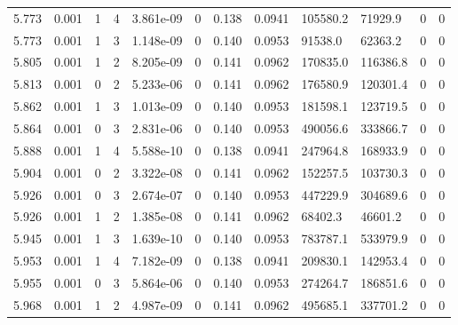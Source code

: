 \documentclass[preview]{standalone}
\begin{document}
{{{{{{{{\begin{tabular}{L{1.2cm}C{1.2cm} C{0.3cm}C{0.5cm} C{1.4cm}C{1.4cm} C{1.4cm}C{1.4cm} C{1.6cm}C{1.6cm} C{1.6cm}C{1.6cm}}
  5.773  &  0.001  & 1     &  4 &  3.861e-09  & 0  &  0.138&   0.0941& 105580.2 & 71929.9   &  0 & 0  \\ 
  5.773  &  0.001  & 1     &  3 &  1.148e-09  & 0  &  0.140&   0.0953& 91538.0 & 62363.2   &  0 & 0  \\ 
  5.805  &  0.001  & 1     &  2 &  8.205e-09  & 0  &  0.141&   0.0962& 170835.0 & 116386.8   &  0 & 0  \\ 
  5.813  &  0.001  & 0     &  2 &  5.233e-06  & 0  &  0.141&   0.0962& 176580.9 & 120301.4   &  0 & 0  \\ 
  5.862  &  0.001  & 1     &  3 &  1.013e-09  & 0  &  0.140&   0.0953& 181598.1 & 123719.5   &  0 & 0  \\ 
  5.864  &  0.001  & 0     &  3 &  2.831e-06  & 0  &  0.140&   0.0953& 490056.6 & 333866.7   &  0 & 0  \\ 
  5.888  &  0.001  & 1     &  4 &  5.588e-10  & 0  &  0.138&   0.0941& 247964.8 & 168933.9   &  0 & 0  \\ 
  5.904  &  0.001  & 0     &  2 &  3.322e-08  & 0  &  0.141&   0.0962& 152257.5 & 103730.3   &  0 & 0  \\ 
  5.926  &  0.001  & 0     &  3 &  2.674e-07  & 0  &  0.140&   0.0953& 447229.9 & 304689.6   &  0 & 0  \\ 
  5.926  &  0.001  & 1     &  2 &  1.385e-08  & 0  &  0.141&   0.0962& 68402.3 & 46601.2   &  0 & 0  \\ 
  5.945  &  0.001  & 1     &  3 &  1.639e-10  & 0  &  0.140&   0.0953& 783787.1 & 533979.9   &  0 & 0  \\ 
  5.953  &  0.001  & 1     &  4 &  7.182e-09  & 0  &  0.138&   0.0941& 209830.1 & 142953.4   &  0 & 0  \\ 
  5.955  &  0.001  & 0     &  3 &  5.864e-06  & 0  &  0.140&   0.0953& 274264.7 & 186851.6   &  0 & 0  \\ 
  5.968  &  0.001  & 1     &  2 &  4.987e-09  & 0  &  0.141&   0.0962& 495685.1 & 337701.2   &  0 & 0  \\ 
\hline 
\end{tabular} 

}}}}}}}}
\end{document}
